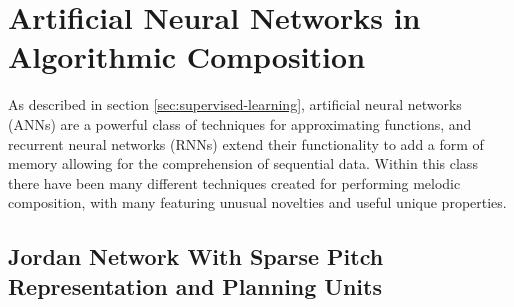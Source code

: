\documentclass[ author={Stephen Livermore-Tozer},
				supervisor={Dr. Peter Flach},
				degree={MEng},
				title={Algorithmic Co-composition Using Machine Learning},
				subtitle={},
				type={research},
				year={2016} ]{dissertation}
\begin{document}
%	
%	
%	
	
	\section{Artificial Neural Networks in Algorithmic Composition}
	\label{sec:anns}
	
	As described in section \ref{sec:supervised-learning}, artificial neural networks (ANNs) are a powerful class of techniques for approximating functions, and recurrent neural networks (RNNs) extend their functionality to add a form of memory allowing for the comprehension of sequential data. Within this class there have been many different techniques created for performing melodic composition, with many featuring unusual novelties and useful unique properties.
	
	\subsection{Jordan Network With Sparse Pitch Representation and Planning Units}
	\label{sec:todd-net}
	
\end{document}
